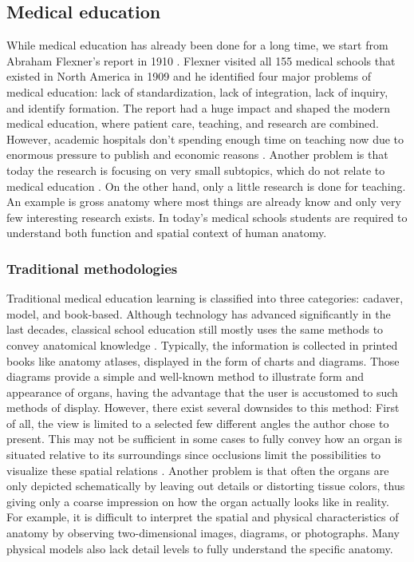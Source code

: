 \subsection{Medical education}
While medical education has already been done for a long time, we start from Abraham Flexner's report in 1910 \citep{Flexner1910}. Flexner visited all 155 medical schools that existed in North America in 1909 and he identified four major problems of medical education: lack of standardization, lack of integration, lack of inquiry, and identify formation. The report had a huge impact and shaped the modern medical education, where patient care, teaching, and research are combined. However, academic hospitals don't spending enough time on teaching now due to enormous pressure to publish and economic reasons \cite{Saidi2007}. Another problem is that today the research is focusing on very small subtopics, which do not relate to medical education \cite{Ludmerer2003}. On the other hand, only a little research is done for teaching. An example is gross anatomy where most things are already know and only very few interesting research exists.
In today's medical schools students are required to understand both function and spatial context of human anatomy. 

\subsubsection{Traditional methodologies} 
Traditional medical education learning is classified into three categories: cadaver, model, and book-based. Although technology has advanced significantly in the last decades, classical school education still mostly uses the same methods to convey anatomical knowledge \cite{Dunnill2013}. Typically, the information is collected in printed books like anatomy atlases, displayed in the form of charts and diagrams. Those diagrams provide a simple and well-known method to illustrate form and appearance of organs, having the advantage that the user is accustomed to such methods of display. However, there exist several downsides to this method: First of all, the view is limited to a selected few different angles the author chose to present. This may not be sufficient in some cases to fully convey how an organ is situated relative to its surroundings since occlusions limit the possibilities to visualize these spatial relations \cite{AGilroyBMacpherson2012}. Another problem is that often the organs are only depicted schematically by leaving out details or distorting tissue colors, thus giving only a coarse impression on how the organ actually looks like in reality.
For example, it is difficult to interpret the spatial and physical characteristics of anatomy by observing two-dimensional images, diagrams, or photographs. Many physical models also lack detail levels to fully understand the specific anatomy. 

